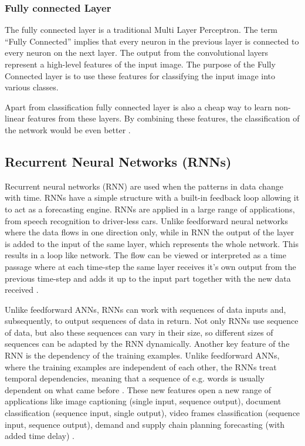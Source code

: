 \subsubsection{Fully connected Layer}
The fully connected layer is a traditional Multi Layer Perceptron. The term “Fully Connected” implies that every neuron in the previous layer is connected to every neuron on the next layer. The output from the convolutional layers represent a high-level features of the input image. The purpose of the Fully Connected layer is to use these features for classifying the input image into various classes. 

Apart from classification fully connected layer is also a cheap way to learn non-linear features from these layers. By combining these features, the classification of the network would be even better \cite{Fully_Connected_Layer}.

\subsection{Recurrent Neural Networks (RNNs)} \label{RNN}
Recurrent neural networks (RNN) are used when the patterns in data change with time. RNNs have a simple structure with a built-in feedback loop allowing it to act as a forecasting engine. RNNs are applied in a large range of applications, from speech recognition to driver-less cars. Unlike feedforward neural networks where the data flows in one direction only, while in RNN the output of the layer is added to the input of the same layer, which represents the whole network. This results in a loop like network. The flow can be viewed or interpreted as a time passage where at each time-step the same layer receives it's own output from the previous time-step and adds it up to the input part together with the new data received \cite{RNNvideo}. 

Unlike feedforward ANNs, RNNs can work with sequences of data inputs and, subsequently, to output sequences of data in return. Not only RNNs use sequence of data, but also these sequences can vary in their size, so different sizes of sequences can be adapted by the RNN dynamically. Another key feature of the RNN is the dependency of the training examples. Unlike feedforward ANNs, where the training examples are independent of each other, the RNNs treat temporal dependencies, meaning that a sequence of e.g. words is usually dependent on what came before \cite{NeonRNN}. These new features open a new range of applications like image captioning (single input, sequence output), document classification (sequence input, single output), video frames classification (sequence input, sequence output), demand and supply chain planning forecasting (with added time delay) \cite{RNNvideo}.

